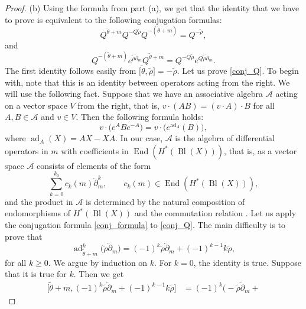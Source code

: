 \documentclass[pdftex]{sigma}
\numberwithin{equation}{section}
\begin{document}
\begin{proof}
(b) Using the formula from part (a), we get that the identity that we
have to prove is equivalent to the following conjugation formulas:
\[
Q^{\widetilde{\theta}+m} Q^{-Q\widetilde{\rho}}
Q^{-(\widetilde{\theta}+m)} = Q^{-\widetilde{\rho}},
\]
and
\begin{equation}\label{conj_Q}
Q^{-(\widetilde{\theta}+m)}
e^{\widetilde{\rho} \overleftarrow{\partial}_m}
Q^{\widetilde{\theta}+m} =
Q^{-Q \widetilde{\rho}}
e^{Q \widetilde{\rho} \overleftarrow{\partial}_m}.
\end{equation}
The first identity follows easily from
$\big[\widetilde{\theta},\widetilde{\rho}\big]=-\widetilde{\rho} $. Let us
prove \eqref{conj_Q}. To begin with, note that this is an
identity between operators acting from the right. We will use the
following fact. Suppose that we have an associative algebra
$\mathcal{A}$ acting on a
vector space $V$ from the right, that is, $v\cdot (AB) = (v\cdot
A)\cdot B$ for all $A,B\in \mathcal{A}$ and $v\in V$. Then the
following formula holds:
\begin{equation}\label{conj_formula}
v\cdot \big(e^A B e^{-A}\big) = v\cdot
\big(e^{\operatorname{ad}_A}(B)\big),
\end{equation}
where $\operatorname{ad}_A(X)=AX-XA$. In our case, $\mathcal{A}$ is
the algebra of differential operators in $m$ with coefficients in
$\operatorname{End}(H^*(\operatorname{Bl}(X)))$, that is, as a vector space
$\mathcal{A}$ consists of elements of the form
\[
\sum_{k=0}^{k_0} c_k(m) \overleftarrow{\partial}_m^k,\qquad
c_k(m)\in \operatorname{End}(H^*(\operatorname{Bl}(X))),
\]
and the product in $\mathcal{A}$ is determined by the natural
composition of endomorphisms of $H^*(\operatorname{Bl}(X))$ and the
commutation relation .
Let us apply the conjugation formula \eqref{conj_formula} to
\eqref{conj_Q}. The main difficulty is to prove that
\begin{equation}\label{ad^k}
\operatorname{ad}_{\widetilde{\theta}+m}^k\big(
\widetilde{\rho} \overleftarrow{\partial}_m\big) =
(-1)^{k} \widetilde{\rho} \overleftarrow{\partial}_m+
(-1)^{k-1} k \widetilde{\rho},
\end{equation}
for all $k\geq 0$. We argue by induction on $k$. For $k=0$, the
identity is true. Suppose that it is true for $k$. Then we get
\begin{align*}
\big[\widetilde{\theta}+m,
(-1)^k \widetilde{\rho} \overleftarrow{\partial}_m +
(-1)^{k-1} k \widetilde{\rho}\big] &=
(-1)^k\big(-\widetilde{\rho} \overleftarrow{\partial}_m +

\end{align*}
\end{proof}
\end{document}
